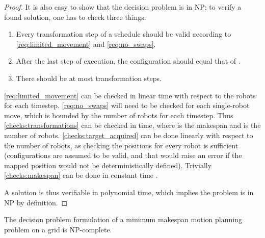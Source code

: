 \begin{proof}
	It is also  easy to show that the decision problem is in NP; to verify a found solution, one has to check three things:
	\begin{enumerate}
		\item Every transformation step of a schedule should be valid according to \cref{req:limited_movement} and \cref{req:no_swaps}.\label{checks:transformations}
		\item After the last step of execution, the configuration should equal that of .\label{checks:target_acquired}
		\item There should be at most  transformation steps.\label{checks:makespan}
	\end{enumerate}
	\cref{req:limited_movement} can be checked in linear time with respect to the robots for each timestep. \cref{req:no_swaps} will need to be checked for each single-robot move, which is bounded by the number of robots for each timestep. Thus \cref{checks:transformations} can be checked in  time, where  is the makespan and  is the number of robots. \cref{checks:target_acquired} can be done linearly with respect to the number of robots, as checking the positions for every robot is sufficient (configurations are assumed to be valid, and that  would raise an error if the mapped position would not be deterministically defined). Trivially \cref{checks:makespan} can be done in constant time . 

	A solution is thus verifiable in polynomial time, which implies the problem is in NP by definition.
\end{proof}

\begin{theorem}\label{thm:npc}
	The decision problem formulation of a minimum makespan motion planning problem on a grid is NP-complete.
\end{theorem}

